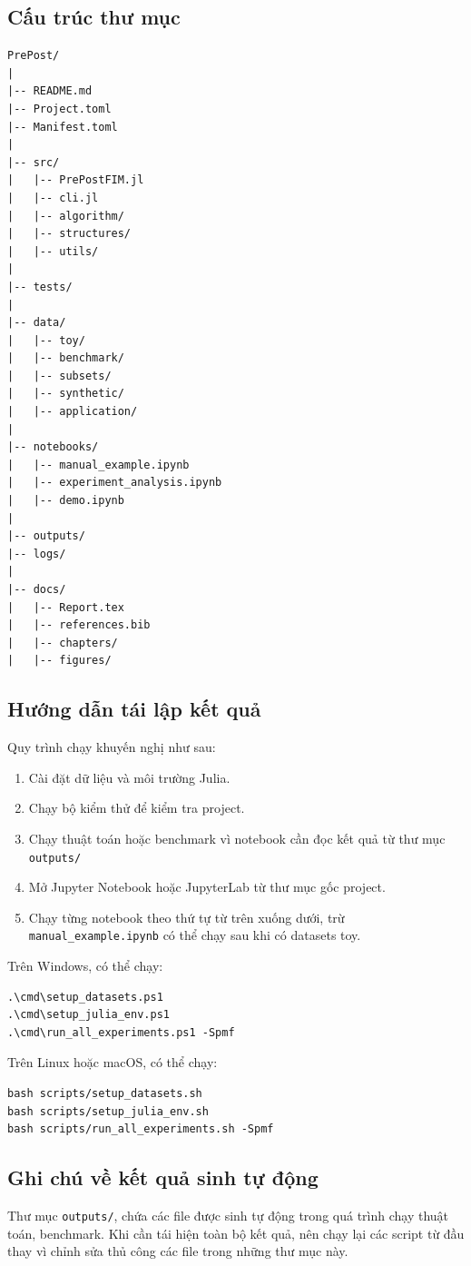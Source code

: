 \documentclass[12pt,a4paper]{article}
\begin{document}
\subsection{Cấu trúc thư mục}

\begin{verbatim}
PrePost/
|
|-- README.md
|-- Project.toml
|-- Manifest.toml
|
|-- src/
|   |-- PrePostFIM.jl
|   |-- cli.jl
|   |-- algorithm/
|   |-- structures/
|   |-- utils/
|
|-- tests/
|
|-- data/
|   |-- toy/
|   |-- benchmark/
|   |-- subsets/
|   |-- synthetic/
|   |-- application/
|
|-- notebooks/
|   |-- manual_example.ipynb
|   |-- experiment_analysis.ipynb
|   |-- demo.ipynb
|
|-- outputs/
|-- logs/
|
|-- docs/
|   |-- Report.tex
|   |-- references.bib
|   |-- chapters/
|   |-- figures/
\end{verbatim}

\subsection{Hướng dẫn tái lập kết quả}

Quy trình chạy khuyến nghị như sau:

\begin{enumerate}
    \item Cài đặt dữ liệu và môi trường Julia.
    \item Chạy bộ kiểm thử để kiểm tra project.
    \item Chạy thuật toán hoặc benchmark vì notebook cần đọc kết quả từ thư mục \texttt{outputs/}
    \item Mở Jupyter Notebook hoặc JupyterLab từ thư mục gốc project.
    \item Chạy từng notebook theo thứ tự từ trên xuống dưới, trừ \texttt{manual\_example.ipynb} có thể chạy sau khi có datasets toy.
\end{enumerate}

Trên Windows, có thể chạy:

\begin{verbatim}
.\cmd\setup_datasets.ps1
.\cmd\setup_julia_env.ps1
.\cmd\run_all_experiments.ps1 -Spmf
\end{verbatim}

Trên Linux hoặc macOS, có thể chạy:

\begin{verbatim}
bash scripts/setup_datasets.sh
bash scripts/setup_julia_env.sh
bash scripts/run_all_experiments.sh -Spmf
\end{verbatim}

\subsection{Ghi chú về kết quả sinh tự động}

Thư mục \texttt{outputs/}, chứa các file được sinh tự động trong quá trình chạy thuật toán, benchmark. Khi cần tái hiện toàn bộ kết quả, nên chạy lại các script từ đầu thay vì chỉnh sửa thủ công các file trong những thư mục này.
\end{document}
